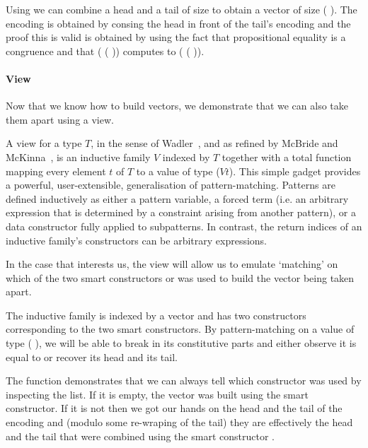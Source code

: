 
Using \IdrisFunction{(::)} we can combine a head and a tail of size 
to obtain a vector of size ( ).
%
The encoding is obtained by consing the head in front of the tail's encoding
and the proof this is valid is obtained by using the fact that propositional
equality is a congruence and that
( ( \IdrisData{::} ))
computes to ( ( )).

\paragraph{View}
Now that we know how to build vectors, we demonstrate that we can also take
them apart using a view.

A view for a type $T$, in the sense of Wadler~\cite{DBLP:conf/popl/Wadler87},
and as refined by McBride and McKinna~\cite{DBLP:journals/jfp/McBrideM04},
is an inductive family $V$ indexed by $T$ together with a total function
mapping every element $t$ of $T$ to a value of type ($V t$).
%
This simple gadget provides a powerful, user-extensible, generalisation of
pattern-matching.
%
Patterns are defined inductively as either a pattern variable, a forced term
(i.e. an arbitrary expression that is determined by a constraint arising from
another pattern), or a data constructor fully applied to subpatterns.
%
In contrast, the return indices of an inductive family's constructors can be
arbitrary expressions.

In the case that interests us, the view will allow us to emulate `matching'
on which of the two smart constructors  or \IdrisFunction{(::)}
was used to build the vector being taken apart.


The inductive family  is indexed by a vector and has two
constructors corresponding to the two smart constructors.
%
By pattern-matching on a value of type ( ),
we will be able to break  in its constitutive parts and
either observe it is equal to  or recover its head
and its tail.


The function  demonstrates that we can always tell which
constructor was used by inspecting the  list. If it
is empty, the vector was built using the  smart constructor.
If it is not then we got our hands on the head and the tail of the encoding
and (modulo some re-wraping of the tail) they are effectively the head and the
tail that were combined using the smart constructor \IdrisFunction{(::)}.


